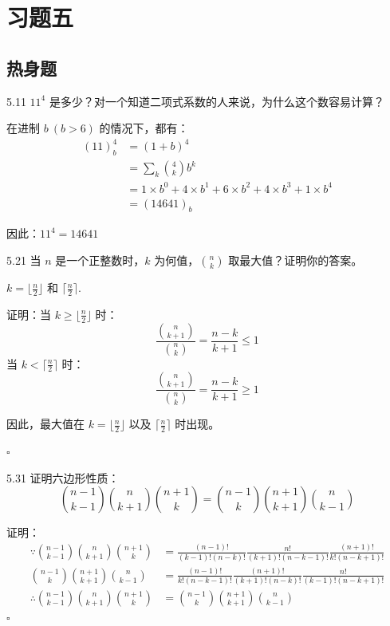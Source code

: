 \section{习题五}

\subsection{热身题}

\begin{problem}{5.1}{1}
  \( 11^4 \) 是多少？对一个知道二项式系数的人来说，为什么这个数容易计算？
\end{problem}

在进制 \( b \ (b > 6) \) 的情况下，都有：
\begin{align*}
  (11)_b^4 &= (1 + b)^4 \\
  &= \sum_k \binom{4}{k} b^k \\
  &= 1 \times b^0 + 4 \times b^1 + 6 \times b^2 + 4 \times b^3 + 1 \times b^4 \\
  &= (14641)_b
\end{align*}

因此：\( 11^4 = 14641 \)

\begin{problem}{5.2}{1}
  当 \( n \) 是一个正整数时，\( k \) 为何值，\( \binom{n}{k} \) 取最大值？证明你的答案。
\end{problem}

\( k = \lfloor \frac{n}{2} \rfloor \) 和 \( \lceil \frac{n}{2} \rceil \).

证明：当 \( k \ge \lfloor \frac{n}{2} \rfloor \) 时：
\[
  \frac{\binom{n}{k+1}}{\binom{n}{k}} = \frac{n-k}{k+1} \le 1
\]
当 \( k < \lceil \frac{n}{2} \rceil \) 时：
\[
  \frac{\binom{n}{k+1}}{\binom{n}{k}} = \frac{n-k}{k+1} \ge 1
\]

因此，最大值在 \( k = \lfloor \frac{n}{2} \rfloor \) 以及 \( \lceil \frac{n}{2} \rceil \) 时出现。

\hfill \( \square \)

\begin{problem}{5.3}{1}
  证明六边形性质：
  \[
    \binom{n-1}{k-1} \binom{n}{k+1} \binom{n+1}{k} = \binom{n-1}{k} \binom{n+1}{k+1} \binom{n}{k-1}
  \]
\end{problem}

证明：
\begin{align*}
  \because
  \binom{n-1}{k-1} \binom{n}{k+1} \binom{n+1}{k} &= \frac{(n-1)!}{(k-1)! (n-k)!} \frac{n!}{(k+1)! (n-k-1)!} \frac{(n+1)!}{k! (n-k+1)!} \\
  \binom{n-1}{k} \binom{n+1}{k+1} \binom{n}{k-1} &= \frac{(n-1)!}{k! (n-k-1)!} \frac{(n+1)!}{(k+1)! (n-k)!} \frac{n!}{(k-1)! (n-k+1)!} \\
  \therefore \binom{n-1}{k-1} \binom{n}{k+1} \binom{n+1}{k} &= \binom{n-1}{k} \binom{n+1}{k+1} \binom{n}{k-1}
\end{align*}
\hfill \( \square \)

